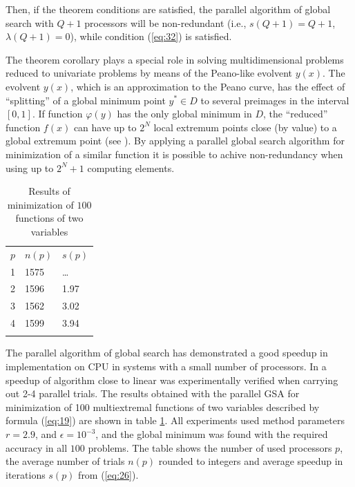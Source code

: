 \documentclass[smallcondensed]{svjour3}     %
\begin{document}
Then, if the theorem conditions are satisfied, the parallel algorithm of global search with $Q+1$ processors will be non-redundant (i.e., $s(Q+1)= Q+1$, \mbox{$\lambda(Q+1)=0$}), while condition (\ref{eq:32}) is satisfied.

The theorem corollary plays a special role in solving multidimensional problems reduced to univariate problems by means of the Peano-like evolvent $y(x)$. The evolvent $y(x)$, which is an approximation to the Peano curve, has the effect of ``splitting'' of a global minimum point $y^\ast\in D$ to several preimages in the interval $[0,1]$. If function $\varphi(y)$ has the only global minimum in $D$, the ``reduced'' function $f(x)$ can have up to $2^N$ local extremum points close (by value) to a global extremum point (see \cite{RefStrongin2000}). By applying a parallel global search algorithm for minimization of a similar function it is possible to achive non-redundancy when using up to $2^N+1$ computing elements.

\begin{table}
	\caption{Results of minimization of $100$ functions of two variables}
	\label{tab:1}
	\center
	\begin{tabular}{lll}
		\hline\noalign{\smallskip}
		 $p$ & $n(p)$ & $s(p)$ \\
		\noalign{\smallskip} \hline \noalign{\smallskip}
			1 &	1575 &	\dots \\
			2 &	1596 &	1.97 \\
			3 &	1562 &	3.02 \\
			4 &	1599 &	3.94 \\
		\noalign{\smallskip}\hline
	\end{tabular}
\end{table}


The parallel algorithm of global search has demonstrated a good speedup in implementation on CPU in systems with a small number of processors. In \cite{RefGrishagin1997,RefStrongin2003} a speedup of algorithm close to linear was experimentally verified when carrying out 2-4 parallel trials. The results obtained with the parallel GSA for minimization of 100 multiextremal functions of two variables described by formula (\ref{eq:19}) are shown in table \ref{tab:1}. All experiments used method parameters $r=2.9$, and $\epsilon=10^{-3}$, and the global minimum was found with the required accuracy in all $100$ problems. The table shows the number of used processors $p$, the average number of trials $n(p)$ rounded to integers and average speedup in iterations $s(p)$ from (\ref{eq:26}). 
\end{document}
